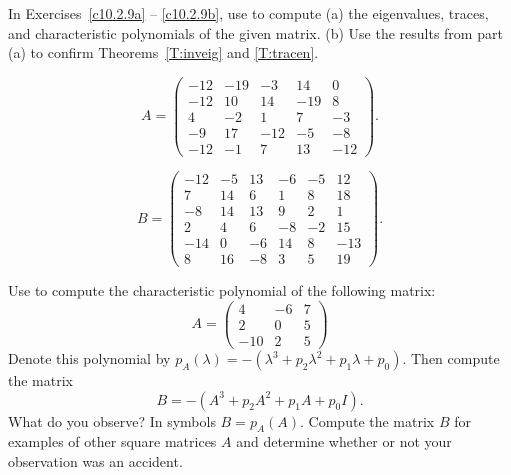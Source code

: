 \noindent In Exercises~\ref{c10.2.9a} -- \ref{c10.2.9b}, use \Matlab to 
compute (a) the eigenvalues, traces, and characteristic polynomials of 
the given matrix.  (b) Use the results from part (a) to confirm 
Theorems~\ref{T:inveig} and \ref{T:tracen}.
\begin{exercise} \label{c10.2.9a}
\begin{equation*}
A=\left( \begin{array}{rrrrr}
      -12 & -19 &  -3 &  14 &   0\\
      -12 &  10 &  14 & -19 &   8\\
        4 &  -2 &   1 &   7 &  -3\\
       -9 &  17 & -12 &  -5 &  -8\\
      -12 &  -1 &   7 &  13 & -12
\end{array} \right).
\end{equation*}
\end{exercise}
\begin{exercise} \label{c10.2.9b}
\begin{equation*}
B=\left( \begin{array}{rrrrrr}
      -12 &  -5 &  13 &  -6 & -5 &  12\\
        7 &  14 &   6 &   1 &  8 &  18\\
       -8 &  14 &  13 &   9 &  2 &   1\\
        2 &   4 &   6 &  -8 & -2 &  15\\
      -14 &   0 &  -6 &  14 &  8 & -13\\
        8 &  16 &  -8 &   3 &  5 &  19
\end{array} \right).
\end{equation*}
\end{exercise}

\begin{exercise} \label{c10.2.10}
Use \Matlab to compute the characteristic polynomial of the following
matrix:
\[
A = \left( \begin{array}{rrr}
 4 & -6 & 7\\
 2 & 0 & 5\\
-10 & 2 & 5
\end{array} \right)
\]
Denote this polynomial by $p_A(\lambda) = 
-(\lambda^3 + p_2 \lambda^2 + p_1 \lambda + p_0)$.  Then compute
the matrix
\[
B = -(A^3 + p_2 A^2 + p_1 A + p_0 I).
\]
What do you observe?  In symbols $B=p_A(A)$.  Compute the matrix $B$ for
examples of other square matrices $A$ and determine whether or not 
your observation was an accident.
\end{exercise}





